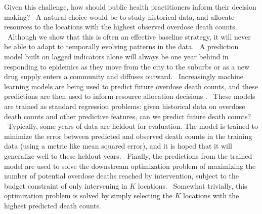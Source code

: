 Given this challenge, how should public health practitioners inform their decision making? \
A natural choice would be to study historical data, and allocate resources to the locations with the highest observed overdose death counts. \
Although we show that this is often an effective baseline strategy, it will never be able to adapt to temporally evolving patterns in the data. \
A prediction model built on lagged indicators alone will always be one year behind in responding to epidemics as they move from the city to the suburbs or as a new drug supply enters a community and diffuses outward. \
Increasingly machine learning models are being used to predict future overdose death counts, and these predictions are then used to inform resource allocation decisions \citep{marksMethodologicalApproachesPrediction2021,borquezFatalOverdosePredicting2022,heutonZIGP2022, acharyaExploringCountylevelSpatiotemporal2022, allenTranslatingPredictiveAnalytics2023,ertugrulCASTNetCommunityAttentiveSpatioTemporal2019}. \
These models are trained as standard regression problems: given historical data on overdose death counts and other predictive features, can we predict future death counts? \
Typically, some years of data are heldout for evaluation. The model is trained to minimize the error between predicted and observed death counts in the training data (using a metric like mean squared error), and it is hoped that it will generalize well to these heldout years. \
Finally, the predictions from the trained model are used to solve the downstream optimization problem of maximizing the number of potential overdose deaths reached by intervention, subject to the budget constraint of only intervening in $K$ locations. \
Somewhat trivially, this optimization problem is solved by simply selecting the $K$ locations with the highest predicted death counts.

